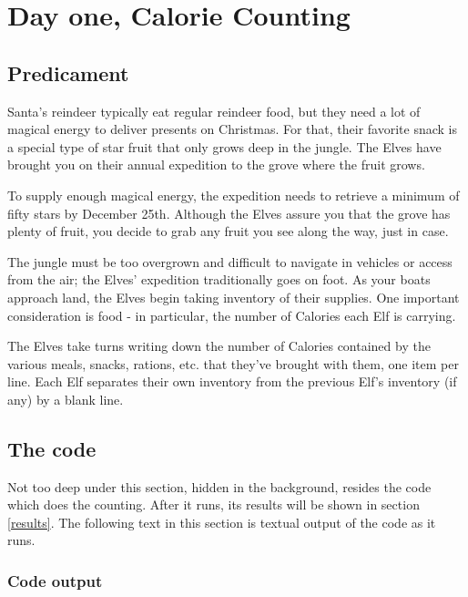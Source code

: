 \documentclass[]{article}
\begin{document}
    
  \section{Day one, Calorie Counting}

    \subsection{Predicament}

      Santa's reindeer typically eat regular reindeer food, but they need a lot of magical energy to deliver presents on Christmas. For that, their favorite snack is a special type of star fruit that only grows deep in the jungle. The Elves have brought you on their annual expedition to the grove where the fruit grows.

      To supply enough magical energy, the expedition needs to retrieve a minimum of fifty stars by December 25th. Although the Elves assure you that the grove has plenty of fruit, you decide to grab any fruit you see along the way, just in case.

      The jungle must be too overgrown and difficult to navigate in vehicles or access from the air; the Elves' expedition traditionally goes on foot. As your boats approach land, the Elves begin taking inventory of their supplies. One important consideration is food - in particular, the number of Calories each Elf is carrying.

      The Elves take turns writing down the number of Calories contained by the various meals, snacks, rations, etc. that they've brought with them, one item per line. Each Elf separates their own inventory from the previous Elf's inventory (if any) by a blank line.

    \subsection{The code}

      Not too deep under this section, hidden in the background, resides the code which does the counting. After it runs, its results will be shown in section \ref{results}. The following text in this section is textual output of the code as it runs.

      \subsubsection{Code output}

        
        \ExplSyntaxOn
\end{document}
